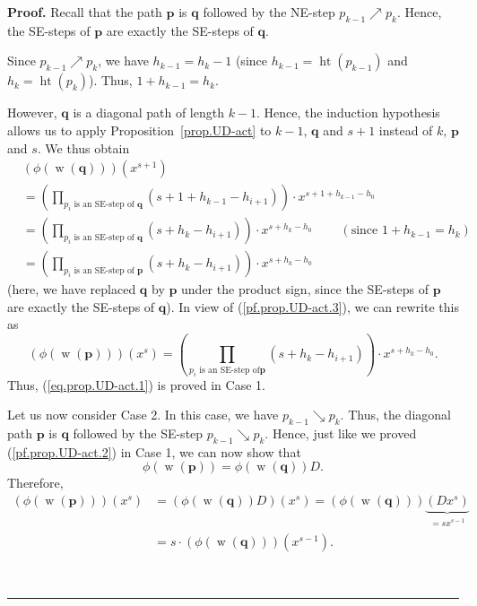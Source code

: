 \documentclass[numbers=enddot,12pt,final,onecolumn,notitlepage]{scrartcl}%
\theoremstyle{definition}
\newenvironment{proof}[1][Proof]{\noindent\textbf{#1.} }{\ \rule{0.5em}{0.5em}}
\newcommand{\pp}{\mathbf{p}}
\newcommand{\qq}{\mathbf{q}}
\newcommand{\w}{\operatorname{w}}
\newcommand{\htt}{\operatorname{ht}}
\newenvironment{verlong}{}{}
\begin{document}
\begin{verlong}
\begin{proof}
Recall that the path $\pp$ is $\qq$ followed by the NE-step
$p_{k-1}\nearrow p_{k}$. Hence, the SE-steps of $\pp$ are exactly the
SE-steps of $\qq$.

Since $p_{k-1}\nearrow p_{k}$, we have $h_{k-1}=h_{k}-1$ (since $h_{k-1}%
=\htt\left(  p_{k-1}\right)  $ and $h_{k}=\htt%
\left(  p_{k}\right)  $). Thus, $1+h_{k-1}=h_{k}$.

However, $\qq$ is a diagonal path of length $k-1$. Hence, the induction
hypothesis allows us to apply Proposition~\ref{prop.UD-act} to $k-1$,
$\qq$ and $s+1$ instead of $k$, $\pp$ and $s$. We thus obtain%
\begin{align*}
&  \left(  \phi\left(  \w\left(  \qq\right)  \right)
\right)  \left(  x^{s+1}\right) \\
&  =\left(  \prod_{p_{i}\text{ is an SE-step of }\qq}\left(
s+1+h_{k-1}-h_{i+1}\right)  \right)  \cdot x^{s+1+h_{k-1}-h_{0}}\\
&  =\left(  \prod_{p_{i}\text{ is an SE-step of }\qq}\left(
s+h_{k}-h_{i+1}\right)  \right)  \cdot x^{s+h_{k}-h_{0}}%
\ \ \ \ \ \ \ \ \ \ \left(  \text{since }1+h_{k-1}=h_{k}\right) \\
&  =\left(  \prod_{p_{i}\text{ is an SE-step of }\pp}\left(
s+h_{k}-h_{i+1}\right)  \right)  \cdot x^{s+h_{k}-h_{0}}%
\end{align*}
(here, we have replaced $\qq$ by $\pp$ under the product sign,
since the SE-steps of $\pp$ are exactly the SE-steps of $\qq$).
In view of (\ref{pf.prop.UD-act.3}), we can rewrite this as
\[
\left(  \phi\left(  \w\left(  \pp\right)  \right)
\right)  \left(  x^{s}\right)
= \left(  \prod_{p_{i}\text{ is an SE-step of
}\pp}\left(  s+h_{k}-h_{i+1}\right)  \right)  \cdot x^{s+h_{k}-h_{0}}.
\]
Thus, (\ref{eq.prop.UD-act.1}) is proved in Case 1.

Let us now consider Case 2. In this case, we have $p_{k-1}\searrow p_{k}$.
Thus, the diagonal path $\pp$ is $\qq$ followed by the SE-step
$p_{k-1}\searrow p_{k}$. Hence, just like we proved (\ref{pf.prop.UD-act.2})
in Case 1, we can now show that%
\[
\phi\left(  \w\left(  \pp\right)  \right)  =\phi\left(
\w\left(  \qq\right)  \right)  D.
\]
Therefore,%
\begin{align}
\left(  \phi\left(  \w\left(  \pp\right)  \right)
\right)  \left(  x^{s}\right)   &  =\left(  \phi\left(  \w%
\left(  \qq\right)  \right)  D\right)  \left(  x^{s}\right)  =\left(
\phi\left(  \w\left(  \qq\right)  \right)  \right)
\underbrace{\left(  Dx^{s}\right)  }_{\substack{=sx^{s-1}}}\nonumber\\
&  =s\cdot\left(  \phi\left(  \w\left(  \qq\right)
\right)  \right)  \left(  x^{s-1}\right)  .\label{pf.prop.UD-act.6}%
\end{align}



\end{proof}
\end{verlong}
\end{document}
